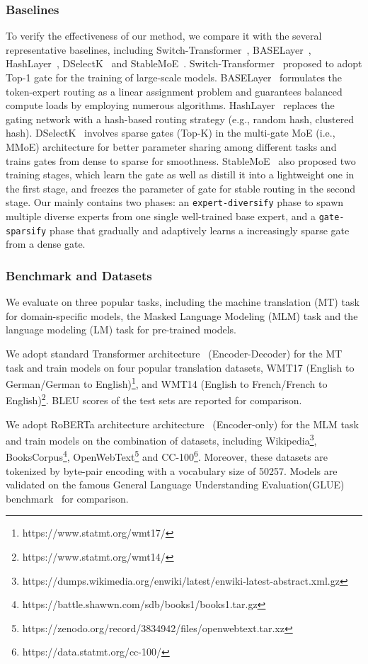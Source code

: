 \subsubsection{Baselines}
To verify the effectiveness of our method, we compare it with the several representative baselines, including Switch-Transformer~\cite{DBLP:switch}, BASELayer~\cite{DBLP:conf/icml/baselayer}, HashLayer~\cite{roller2021hash}, DSelectK~\cite{DBLP:conf/nips/dselectk}
and StableMoE~\cite{DBLP:conf/acl/stablemoe}.
Switch-Transformer~\cite{DBLP:switch} proposed to adopt Top-1 gate for the training of large-scale models.
BASELayer~\cite{lewis2021base} formulates the token-expert routing as a linear assignment problem and guarantees balanced compute loads by employing numerous algorithms. 
HashLayer~\cite{roller2021hash} replaces the gating network with a hash-based routing strategy (e.g., random hash, clustered hash). DSelectK~\cite{DBLP:conf/nips/dselectk} involves sparse gates (Top-K) in the multi-gate MoE (i.e., MMoE) architecture for better parameter sharing among different tasks and trains gates from dense to sparse for smoothness. StableMoE~\cite{DBLP:conf/acl/stablemoe} also proposed two training stages, which learn the gate as well as distill it into a lightweight one in the first stage, and freezes the parameter of gate for stable routing in the second stage.
Our \evomoe mainly contains two phases: an \texttt{expert-diversify}
phase to spawn multiple diverse experts from one single well-trained base expert,
and a \texttt{gate-sparsify} phase that gradually and adaptively learns a increasingly sparse gate from a dense gate.

\subsubsection{Benchmark and Datasets}
We evaluate \evomoe{} on three popular tasks, including the machine translation (MT) task for domain-specific models, the Masked Language Modeling (MLM) task and the language modeling (LM) task for pre-trained models.

We adopt standard Transformer architecture~\cite{vaswani2017attention} (Encoder-Decoder) 
for the MT task and train models on four popular translation datasets, WMT17 (English to German/German to English)\footnote{https://www.statmt.org/wmt17/}, and WMT14 (English to French/French to English)\footnote{https://www.statmt.org/wmt14/}. BLEU scores of the test sets are reported for comparison.

We adopt RoBERTa architecture architecture~\cite{liu2019roberta} (Encoder-only) 
for the MLM task and train models on the combination of datasets, including Wikipedia\footnote{https://dumps.wikimedia.org/enwiki/latest/enwiki-latest-abstract.xml.gz}, BooksCorpus\footnote{https://battle.shawwn.com/sdb/books1/books1.tar.gz}, OpenWebText\footnote{https://zenodo.org/record/3834942/files/openwebtext.tar.xz} and CC-100\footnote{https://data.statmt.org/cc-100/}. Moreover, these datasets are tokenized by byte-pair encoding with a vocabulary size of 50257. Models are validated on the famous General Language Understanding Evaluation(GLUE) benchmark~\cite{DBLP:conf/emnlp/glue} for comparison.

